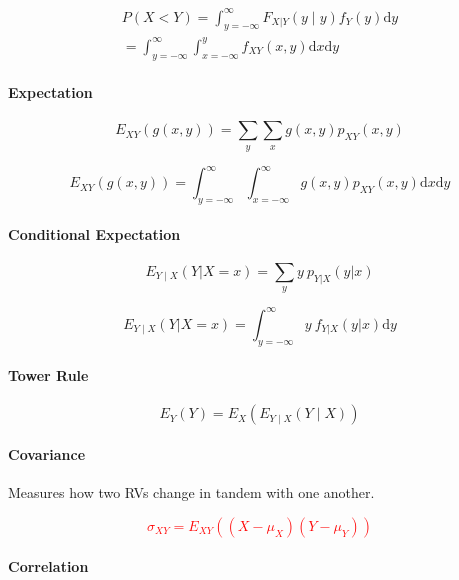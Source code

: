 \documentclass[twocolumn,english]{article}
\begin{document}
\begin{multline*}
P\left(X<Y\right)=\int_{y=-\infty}^{\infty}F_{X|Y}\left(y\mid y\right)f_{Y}\left(y\right)\mbox{d}y\\
=\int_{y=-\infty}^{\infty}\int_{x=-\infty}^{y}f_{XY}\left(x,y\right)\text{d}x\text{d}y
\end{multline*}



\paragraph{Expectation}

\[
E_{XY}\left(g\left(x,y\right)\right)=\sum_{y}\sum_{x}g\left(x,y\right)p_{XY}\left(x,y\right)
\]


\[
E_{XY}\left(g\left(x,y\right)\right)=\int_{y=-\infty}^{\infty}\int_{x=-\infty}^{\infty}g\left(x,y\right)p_{XY}\left(x,y\right)\text{d}x\text{d}y
\]



\paragraph{Conditional Expectation}

\[
E_{Y\mid X}\left(Y|X=x\right)=\sum_{y}y\:p_{Y|X}\left(y|x\right)
\]


\[
E_{Y\mid X}\left(Y|X=x\right)=\int_{y=-\infty}^{\infty}y\:f_{Y|X}\left(y|x\right)\text{d}y
\]



\paragraph{Tower Rule}

\[
E_{Y}\left(Y\right)=E_{X}\left(E_{Y\mid X}\left(Y\mid X\right)\right)
\]



\paragraph{Covariance}

Measures how two RVs change in tandem with one another.

\textrm{\textcolor{red}{
\[
\sigma_{XY}=E_{XY}\left(\left(X-\mu_{X}\right)\left(Y-\mu_{Y}\right)\right)
\]
}}


\paragraph{Correlation}
\end{document}
